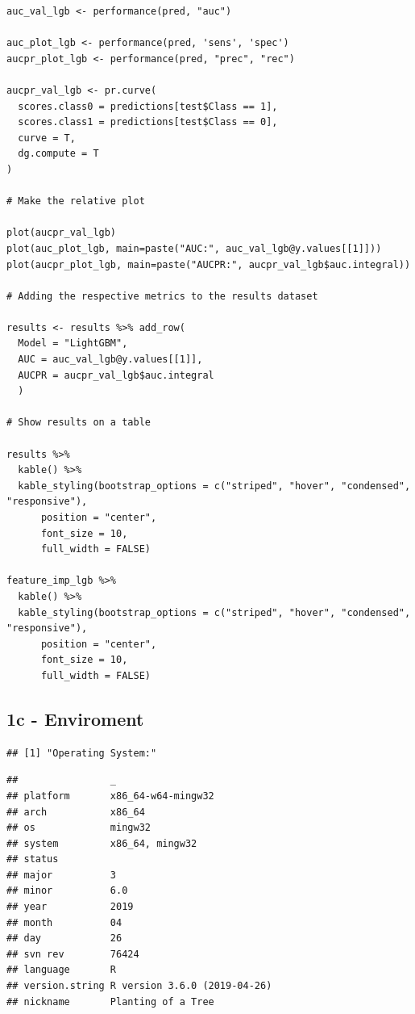 \documentclass[]{article}
\begin{document}
\begin{verbatim}
auc_val_lgb <- performance(pred, "auc")

auc_plot_lgb <- performance(pred, 'sens', 'spec')
aucpr_plot_lgb <- performance(pred, "prec", "rec")

aucpr_val_lgb <- pr.curve(
  scores.class0 = predictions[test$Class == 1], 
  scores.class1 = predictions[test$Class == 0],
  curve = T,  
  dg.compute = T
)

# Make the relative plot

plot(aucpr_val_lgb)
plot(auc_plot_lgb, main=paste("AUC:", auc_val_lgb@y.values[[1]]))
plot(aucpr_plot_lgb, main=paste("AUCPR:", aucpr_val_lgb$auc.integral))

# Adding the respective metrics to the results dataset

results <- results %>% add_row(
  Model = "LightGBM",
  AUC = auc_val_lgb@y.values[[1]],
  AUCPR = aucpr_val_lgb$auc.integral
  )

# Show results on a table

results %>%
  kable() %>%
  kable_styling(bootstrap_options = c("striped", "hover", "condensed",           "responsive"),
      position = "center",
      font_size = 10,
      full_width = FALSE)

feature_imp_lgb %>%
  kable() %>%
  kable_styling(bootstrap_options = c("striped", "hover", "condensed",           "responsive"),
      position = "center",
      font_size = 10,
      full_width = FALSE)
\end{verbatim}

\hypertarget{c---enviroment}{%
\subsection{1c - Enviroment}\label{c---enviroment}}

\begin{verbatim}
## [1] "Operating System:"
\end{verbatim}

\begin{verbatim}
##                _                           
## platform       x86_64-w64-mingw32          
## arch           x86_64                      
## os             mingw32                     
## system         x86_64, mingw32             
## status                                     
## major          3                           
## minor          6.0                         
## year           2019                        
## month          04                          
## day            26                          
## svn rev        76424                       
## language       R                           
## version.string R version 3.6.0 (2019-04-26)
## nickname       Planting of a Tree
\end{verbatim}
\end{document}
